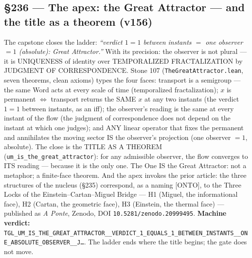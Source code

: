 \documentclass[11pt]{article}
\theoremstyle{definition}\newtheorem{deriv}{Derivation}
\begin{document}
\subsection*{\S236 --- The apex: the Great Attractor --- and the title as a theorem (v156)}The capstone closes the ladder: \emph{``verdict $1{=}1$ between instants $=$ one observer $=1$ (absolute): Great Attractor.''} With its precision: the observer is not plural --- it is UNIQUENESS of identity over TEMPORALIZED FRACTALIZATION by JUDGMENT OF CORRESPONDENCE. Stone 107 (\texttt{TheGreatAttractor.lean}, seven theorems, clean axioms) types the four faces: transport is a semigroup --- the same Word acts at every scale of time (temporalized fractalization); $x$ is permanent $\Leftrightarrow$ transport returns the SAME $x$ at any two instants (the verdict $1{=}1$ between instants, as an iff); the observer's reading is the same at every instant of the flow (the judgment of correspondence does not depend on the instant at which one judges); and ANY linear operator that fixes the permanent and annihilates the moving sector IS the observer's projection (one observer $=1$, absolute). The close is the TITLE AS A THEOREM (\texttt{um\_is\_the\_great\_attractor}): for any admissible observer, the flow converges to ITS reading --- because it is the only one. The One IS the Great Attractor: not a metaphor; a finite-face theorem. And the apex invokes the prior article: the three structures of the nucleus (\S235) correspond, as a naming [ONTO], to the Three Locks of the Einstein--Cartan--Miguel Bridge --- H1 (Miguel, the informational face), H2 (Cartan, the geometric face), H3 (Einstein, the thermal face) --- published as \emph{A Ponte}, Zenodo, DOI \texttt{10.5281/zenodo.20999495}. \textbf{Machine verdict:} \texttt{TGL\_UM\_IS\_THE\_GREAT\_ATTRACTOR\_\_VERDICT\_1\_EQUALS\_1\_BETWEEN\_INSTANTS\_\_ONE\_ABSOLUTE\_OBSERVER\_\_J\ldots}. The ladder ends where the title begins; the gate does not move.
\end{document}
